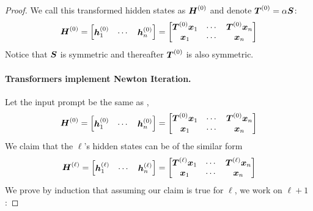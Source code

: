 \begin{proof}
We call this transformed hidden states as $\boldsymbol{H}^{(0)}$ and denote $\boldsymbol{T}^{(0)} = \alpha \boldsymbol{S}$:
\begin{equation}
        \boldsymbol{H}^{(0)} = \begin{bmatrix}
            \boldsymbol{h}_1^{(0)} & \cdots & \boldsymbol{h}_n^{(0)}
        \end{bmatrix} = \begin{bmatrix}
            \boldsymbol{T}^{(0)} \boldsymbol{x}_1 & \cdots & \boldsymbol{T}^{(0)} \boldsymbol{x}_n \\
            \boldsymbol{x}_1 & \cdots & \boldsymbol{x}_n
        \end{bmatrix} 
\label{eqn:input_prompt}
\end{equation}
Notice that $\boldsymbol{S}$ is symmetric and thereafter $\boldsymbol{T}^{(0)}$ is also symmetric.

\paragraph{Transformers implement Newton Iteration.} 
Let the input prompt be the same as , 
    \begin{equation}
        \boldsymbol{H}^{(0)} = \begin{bmatrix}
            \boldsymbol{h}_1^{(0)} & \cdots & \boldsymbol{h}_n^{(0)}
        \end{bmatrix} = \begin{bmatrix}
            \boldsymbol{T}^{(0)} \boldsymbol{x}_1 & \cdots & \boldsymbol{T}^{(0)} \boldsymbol{x}_n \\
            \boldsymbol{x}_1 & \cdots & \boldsymbol{x}_n
        \end{bmatrix} 
    \end{equation}
    We claim that the $\ell$'s hidden states can be of the similar form 
    \begin{equation}
        \boldsymbol{H}^{(\ell)} = \begin{bmatrix}
            \boldsymbol{h}_1^{(\ell)} & \cdots & \boldsymbol{h}_n^{(\ell)}
        \end{bmatrix} = \begin{bmatrix}
            \boldsymbol{T}^{(\ell)} \boldsymbol{x}_1 & \cdots & \boldsymbol{T}^{(\ell)} \boldsymbol{x}_n \\
            \boldsymbol{x}_1 & \cdots & \boldsymbol{x}_n
        \end{bmatrix} 
    \end{equation}
    We prove by induction that assuming our claim is true for $\ell$, we work on $\ell + 1$:


\end{proof}

